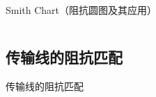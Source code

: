 \begin{frame}{Smith Chart（阻抗圆图及其应用）}
\begin{columns}
\begin{column}{0.5\linewidth}
    \end{column}
  \end{columns}
\end{frame}

\subsection{传输线的阻抗匹配}
\begin{frame}{传输线的阻抗匹配}

\end{frame}
